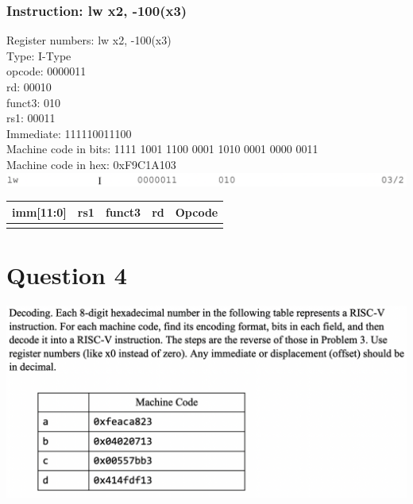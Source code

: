 \documentclass{article}
\begin{document}
\hspace{3in}

\subsubsection*{Instruction: lw  x2, -100(x3)}
Register numbers: lw x2, -100(x3)\\
Type: I-Type\\
opcode: 0000011\\
rd: 00010\\
funct3: 010\\
rs1: 00011\\
Immediate: 111110011100\\
Machine code in bits: 1111 1001 1100 0001 1010 0001 0000 0011\\
Machine code in hex: 0xF9C1A103\\

\includegraphics[scale=.35]{./images/lw1.png}

\begin{center}
	\begin{tabularx}{1.15\textwidth} { 
		| >{\centering\arraybackslash}X 
		| >{\centering\arraybackslash}X 
		| >{\centering\arraybackslash}X 
		| >{\centering\arraybackslash}X
		| >{\centering\arraybackslash}X | }
	   \hline
	   	imm[11:0] & rs1 & funct3 & rd & Opcode \\
	   \hline
	   111110011100  & 00011  & 010 & 00010 & 0000011 \\
	  \hline
	\end{tabularx}
\end{center}

\hspace{3in}

\section*{Question 4}
\begin{center}
	\includegraphics[scale=.572]{./images/Q4Problem.png}
\end{center}
\end{document}
